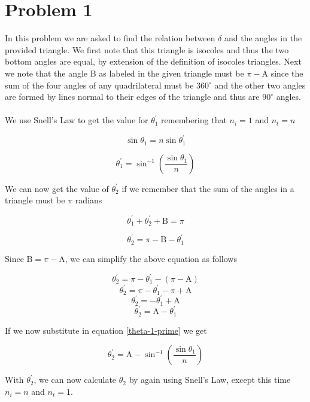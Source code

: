 \section*{Problem 1}

In this problem we are asked to find the relation between $\delta$ and the angles in the provided triangle. We first note that this
triangle is isocoles and thus the two bottom angles are equal, by extension of the definition of isocoles triangles. Next we note that 
the angle B as labeled in the given triangle must be $\pi - \mathrm{A}$ since the sum of the four angles of any quadrilateral must be 
$360^\circ$ and the other two angles are formed by lines normal to their edges of the triangle and thus are $90^\circ$ angles.
\\
\\
We use Snell's Law to get the value for $\theta^{'}_1$ remembering that $n_i = 1$ and $n_t = n$

$$\sin\theta_1 = n\sin\theta^{'}_1$$ 

\begin{equation} \label{theta-1-prime}
	\theta^{'}_1 = \sin^{-1}\left(\frac{\sin\theta_1}{n}\right)
\end{equation}

We can now get the value of $\theta^{'}_2$ if we remember that the sum of the angles in a triangle must be $\pi$ radians

$$\theta^{'}_1 + \theta^{'}_2 + \mathrm{B} = \pi$$

\begin{equation*}
	\theta^{'}_2 = \pi - \mathrm{B} - \theta^{'}_1
\end{equation*}

Since $\mathrm{B} = \pi - \mathrm{A}$, we can simplify the above equation as follows

$$
	\theta^{'}_2 = \pi - \theta^{'}_1 - (\pi - \mathrm{A})
$$
$$
	\theta^{'}_2 = \pi - \theta^{'}_1 - \pi + \mathrm{A}
$$
$$
	\theta^{'}_2 = - \theta^{'}_1 + \mathrm{A}
$$
$$
	\theta^{'}_2 = \mathrm{A} - \theta^{'}_1
$$


If we now substitute in equation \ref{theta-1-prime} we get 

\begin{equation} \label{theta-2-prime}
	\theta^{'}_2 = \mathrm{A} - \sin^{-1}\left(\frac{\sin\theta_1}{n}\right)
\end{equation}

With $\theta^{'}_2$, we can now calculate $\theta_2$ by again using Snell's Law, except this time $n_i = n$ and $n_t = 1$.

